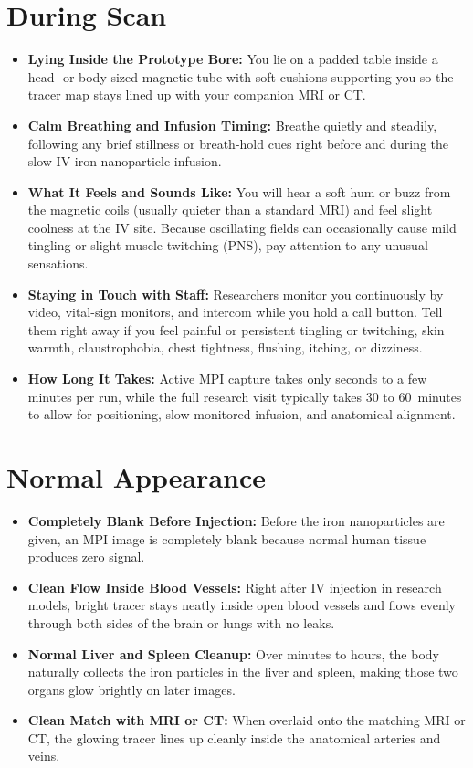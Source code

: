\section{During Scan}
\begin{itemize}
  \item \textbf{Lying Inside the Prototype Bore:} You lie on a padded table inside a head- or body-sized magnetic tube with soft cushions supporting you so the tracer map stays lined up with your companion MRI or CT.
  \item \textbf{Calm Breathing and Infusion Timing:} Breathe quietly and steadily, following any brief stillness or breath-hold cues right before and during the slow IV iron-nanoparticle infusion.
  \item \textbf{What It Feels and Sounds Like:} You will hear a soft hum or buzz from the magnetic coils (usually quieter than a standard MRI) and feel slight coolness at the IV site. Because oscillating fields can occasionally cause mild tingling or slight muscle twitching (PNS), pay attention to any unusual sensations.
  \item \textbf{Staying in Touch with Staff:} Researchers monitor you continuously by video, vital-sign monitors, and intercom while you hold a call button. Tell them right away if you feel painful or persistent tingling or twitching, skin warmth, claustrophobia, chest tightness, flushing, itching, or dizziness.
  \item \textbf{How Long It Takes:} Active MPI capture takes only seconds to a few minutes per run, while the full research visit typically takes 30 to 60~minutes to allow for positioning, slow monitored infusion, and anatomical alignment.
\end{itemize}

\section{Normal Appearance}
\begin{itemize}
  \item \textbf{Completely Blank Before Injection:} Before the iron nanoparticles are given, an MPI image is completely blank because normal human tissue produces zero signal.
  \item \textbf{Clean Flow Inside Blood Vessels:} Right after IV injection in research models, bright tracer stays neatly inside open blood vessels and flows evenly through both sides of the brain or lungs with no leaks.
  \item \textbf{Normal Liver and Spleen Cleanup:} Over minutes to hours, the body naturally collects the iron particles in the liver and spleen, making those two organs glow brightly on later images.
  \item \textbf{Clean Match with MRI or CT:} When overlaid onto the matching MRI or CT, the glowing tracer lines up cleanly inside the anatomical arteries and veins.
\end{itemize}

